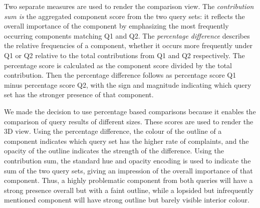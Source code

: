 Two separate measures are used to render the comparison view.
The \emph{contribution sum is} the aggregated component score from the two
query sets: it reflects the overall importance of the component by emphasizing
the most frequently occurring components matching Q1 and
Q2. The \emph{percentage difference} describes the relative frequencies of a
component, whether it occurs more frequently under Q1 or Q2 relative
to the total contributions from Q1 and Q2 respectively. The percentage
score is calculated as the component score divided by the total
contribution. Then the percentage difference follows as percentage
score Q1 minus percentage score Q2, with the sign and magnitude indicating
which query set has the stronger presence of that component.

We made the decision to use percentage based comparisons because it
enables the comparison of query results of different sizes.
These scores are used to render the 3D view. Using the percentage
difference, the colour of the outline of a component indicates which
query set has the higher rate of complaints, and the opacity of the outline
indicates the strength of the difference. Using the contribution
sum, the standard hue and opacity encoding is used to indicate the
sum of the two query sets, giving an impression of the overall importance
of that component. Thus, a highly problematic component from
both queries will have a strong presence overall but with a faint outline,
while a lopsided but infrequently mentioned component will have
strong outline but barely visible interior colour.

